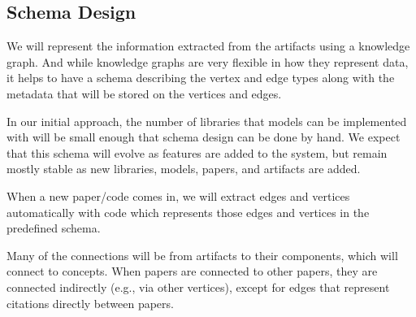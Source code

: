 \documentclass{article}
\begin{document}



\subsection{Schema Design}
We will represent the information extracted from the artifacts using a knowledge graph. And while knowledge graphs are very flexible in how they represent data, it helps to have a schema describing the vertex and edge types along with the metadata that will be stored on the vertices and edges. 

In our initial approach, the number of libraries that models can be implemented with will be small enough that schema design can be done by hand. We expect that this schema will evolve as features are added to the system, but remain mostly stable as new libraries, models, papers, and artifacts are added.

When a new paper/code comes in, we will extract edges and vertices automatically with code which represents those edges and vertices in the predefined schema.

Many of the connections will be from artifacts to their components, which will connect to concepts. When papers are connected to other papers, they are connected indirectly (e.g., via other vertices), except for edges that represent citations directly between papers.
\end{document}
